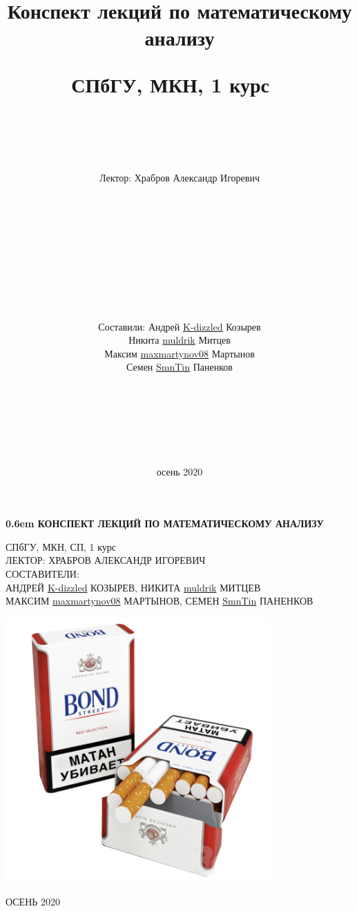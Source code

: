 \documentclass[12pt,letterpaper]{report}
\title{Конспект лекций по математическому анализу

СПбГУ, МКН, 1 курс
\ \\
\ \\ \ \\
}
\author{Лектор: Храбров Александр Игоревич \\
\ \\ \ \\ \ \\ \ \\ \ \\ \ \\ \ \\ \ \\
\ \\ 
\begin{flushright}
Составили: Андрей \href{https://github.com/K-dizzled}{K-dizzled} Козырев \\ Никита  \href{https://github.com/muldrik}{muldrik} Митцев \\ Максим \href{https://github.com/maxmartynov08}{maxmartynov08} Мартынов \\ Семен \href{https://github.com/SmnTin}{SmnTin} Паненков
\end{flushright}
\ \\
\ \\
\ \\
\ \\
\ \\
\ \\}
\date{осень 2020}
\theoremstyle{definition}
\begin{document}
\clearpage
\newcommand\nbvspace[1][3]{\vspace*{\stretch{#1}}}
\newcommand\nbstretchyspace{\spaceskip0.5em plus 0.25em minus 0.25em}
\newcommand{\nbtitlestretch}{\spaceskip0.6em}
\pagestyle{empty}
\begin{center}
\bfseries
\nbvspace[1]
\Huge
{\nbtitlestretch\huge
КОНСПЕКТ ЛЕКЦИЙ ПО МАТЕМАТИЧЕСКОМУ АНАЛИЗУ}

\nbvspace[1]
\normalsize

СПбГУ, МКН, СП, 1 курс\\
ЛЕКТОР: ХРАБРОВ АЛЕКСАНДР ИГОРЕВИЧ
\nbvspace[1]
\\
\Large СОСТАВИТЕЛИ:\\[0.5em]
\footnotesize АНДРЕЙ \href{https://github.com/K-dizzled}{K-dizzled} КОЗЫРЕВ, НИКИТА  \href{https://github.com/muldrik}{muldrik} МИТЦЕВ \\ МАКСИМ \href{https://github.com/maxmartynov08}{maxmartynov08} МАРТЫНОВ, СЕМЕН \href{https://github.com/SmnTin}{SmnTin} ПАНЕНКОВ

\nbvspace[2]

\includegraphics[width=4.0in]{./images/matan_kills.png}
\nbvspace[3]
\normalsize

\large
ОСЕНЬ 2020
\nbvspace[1]
\end{center}
\fi
\tableofcontents
\newpage
\end{document}
